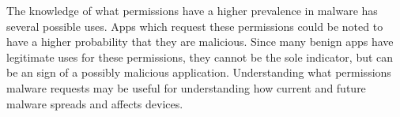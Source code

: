 \documentclass{sig-alternate-05-2015}
\begin{document}

The knowledge of what permissions have a higher prevalence in malware has several possible uses. Apps which request these permissions could be noted to have a higher probability that they are malicious. Since many benign apps have legitimate uses for these permissions, they cannot be the sole indicator, but can be an sign of a possibly malicious application. Understanding what permissions malware requests may be useful for understanding how current and future malware spreads and affects devices.

\end{document}
